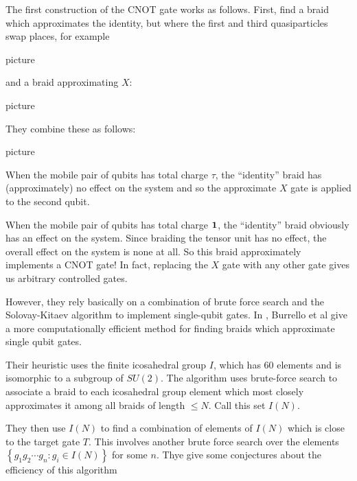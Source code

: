 The first construction of the CNOT gate works as follows. First, find a braid
which approximates the identity, but where the first and third quasiparticles
swap places, for example

\begin{center}
picture
\end{center}

and a braid approximating $X$:


\begin{center}
picture
\end{center}

They combine these as follows:

\begin{center}
picture
\end{center}
When the mobile pair of qubits has total charge $\tau$, the ``identity'' braid
has (approximately) no effect on the system and so the approximate $X$ gate is
applied to the second qubit.

When the mobile pair of qubits has total charge $\mathbf{1}$, the ``identity'' braid
obviously has an effect on the system. Since braiding the tensor unit has no
effect, the overall effect on the system is none at all. So this braid
approximately implements a CNOT gate! In fact, replacing the $X$ gate with any
other gate gives us arbitrary controlled gates.

However, they rely basically on a combination of brute force search and the
Solovay-Kitaev algorithm  to implement single-qubit gates.  In
\cite{Burrello2010}, Burrello et al give a more computationally efficient method for finding braids which approximate single qubit gates.

Their heuristic uses the finite icosahedral group $I$, which has $60$ elements
and is isomorphic to a subgroup of $SU(2)$. The algorithm uses brute-force
search to associate a braid to each icosahedral group element which most
closely approximates it among all braids of length $\leq N$. Call this set
$I(N)$.

They then use $I(N)$ to find a combination of elements of $I(N)$ which is close
to the target gate $T$. This involves another brute force search over the
elements $\left\{ g_1g_2\cdots g_n: g_i \in I(N) \right\}$ for some $n$. Thye
give some conjectures about the efficiency of this algorithm
